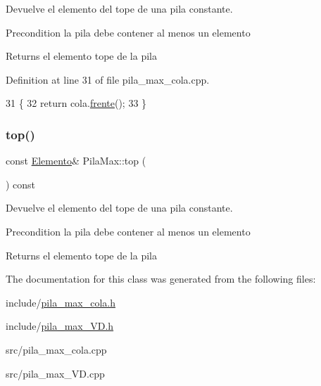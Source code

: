 Devuelve el elemento del tope de una pila constante. 

\begin{DoxyPrecond}{Precondition}
la pila debe contener al menos un elemento 
\end{DoxyPrecond}
\begin{DoxyReturn}{Returns}
el elemento tope de la pila 
\end{DoxyReturn}


Definition at line 31 of file pila\+\_\+max\+\_\+cola.\+cpp.


\begin{DoxyCode}
31                                    \{
32   \textcolor{keywordflow}{return} cola.\hyperlink{classCola_a1df4ad2b50116ef22e77ad3f77b02d29}{frente}();
33 \}
\end{DoxyCode}
\mbox{\label{classPilaMax_afeb131b02d413303ff5740aecd730969}} 
\subsubsection{\texorpdfstring{top()}{top()}\hspace{0.1cm}{\footnotesize\ttfamily [4/4]}}
{\footnotesize\ttfamily const \hyperlink{structElemento}{Elemento}\& Pila\+Max\+::top (\begin{DoxyParamCaption}{ }\end{DoxyParamCaption}) const}



Devuelve el elemento del tope de una pila constante. 

\begin{DoxyPrecond}{Precondition}
la pila debe contener al menos un elemento 
\end{DoxyPrecond}
\begin{DoxyReturn}{Returns}
el elemento tope de la pila 
\end{DoxyReturn}


The documentation for this class was generated from the following files\+:\begin{DoxyCompactItemize}
\item 
include/\hyperlink{pila__max__cola_8h}{pila\+\_\+max\+\_\+cola.\+h}\item 
include/\hyperlink{pila__max__VD_8h}{pila\+\_\+max\+\_\+\+V\+D.\+h}\item 
src/pila\+\_\+max\+\_\+cola.\+cpp\item 
src/pila\+\_\+max\+\_\+\+V\+D.\+cpp\end{DoxyCompactItemize}

